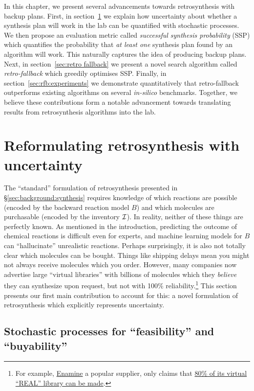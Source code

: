 In this chapter, we present several advancements towards retrosynthesis with backup plans.
First, in section~\ref{sec:retrosynthesis formalism} we explain how uncertainty about whether a synthesis plan will work in the lab
can be quantified with stochastic processes.
We then propose an evaluation metric called \emph{successful synthesis probability} (SSP) which quantifies the probability that \emph{at least one}
synthesis plan found by an algorithm will work. This naturally captures the idea of producing backup plans.
Next, in section~\ref{sec:retro fallback} we present a novel search algorithm called \emph{retro-fallback}
which greedily optimises SSP.
Finally, in section~\ref{sec:rfb:experiments} we demonstrate quantitatively that retro-fallback outperforms existing algorithms on several \textit{in-silico} benchmarks.
Together, we believe these contributions form a notable advancement towards translating results from retrosynthesis algorithms into the lab.

\section{Reformulating retrosynthesis with uncertainty}\label{sec:retrosynthesis formalism}

The ``standard'' formulation of retrosynthesis presented in
\S\ref{sec:background:synthesis} requires knowledge of which reactions are possible
(encoded by the backward reaction model $B$)
and which molecules are purchasable (encoded by the inventory ${\mathcal{I}}$).
In reality, neither of these things are perfectly known.
As mentioned in the introduction,
predicting the outcome of chemical reactions is difficult even for experts,
and machine learning models for $B$ can ``hallucinate'' unrealistic reactions.
Perhaps surprisingly, it is also not totally clear which molecules can be bought.
Things like shipping delays mean you might not always receive molecules which you order.
However, many companies now advertise large ``virtual libraries'' with billions of molecules
which they \emph{believe} they can synthesize upon request, but not with 100\% reliability.\footnote{ For example, \href{https://enamine.net/}{Enamine} a popular supplier, only claims that \href{https://enamine.net/compound-collections/real-compounds}{80\% of its virtual ``REAL'' library can be made}.}
This section presents our first main contribution to account for this:  %
a novel formulation of retrosynthesis which explicitly represents uncertainty.

\subsection{Stochastic processes for ``feasibility'' and ``buyability''}

